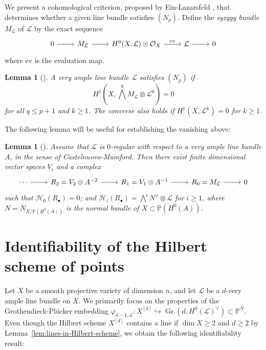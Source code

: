 \documentclass[a4paper]{amsart}
\numberwithin{equation}{section}
\theoremstyle{plain}
\newtheorem{lem}[thm]{Lemma}
\theoremstyle{definition}
\theoremstyle{remark}
\numberwithin{figure}{section}
\numberwithin{table}{section}
\numberwithin{equation}{section}
\def \PP {\mathbb{P}}
\def \Hcal {\mathcal{H}}
\def \Lcal {\mathcal{L}}
\def \Ocal {\mathcal{O}}
\DeclareMathOperator{\Gr}{Gr}
\begin{document}
We present a cohomological criterion, proposed by Ein-Lazarsfeld \cite{EL1993}, that determines whether a given line bundle satisfies $(N_p)$.
Define the \textit{syzygy bundle} $M_{\Lcal}$ of $\Lcal$ by the exact sequence
 \[
  \begin{tikzcd}
      0 \arrow{r} & M_{\Lcal} \arrow{r} & H^0(X, \Lcal) \otimes \Ocal_X \arrow[r, "\mathrm{ev}"] & \Lcal \arrow{r} & 0
  \end{tikzcd}
 \]
where $\mathrm{ev}$ is the evaluation map.

\begin{lem}[{\cite[Lemma~1.6]{EL1993}}] \label{lem:cohomological-criterion-for-np}
    A very ample line bundle $\Lcal$ satisfies $(N_p)$ if
     \begin{equation}
      H^1 \left( X, \bigwedge^q M_{\Lcal} \otimes \Lcal^{k} \right) = 0
     \end{equation}
    for all $q \leq p+1$ and $k \geq 1$.
    The converse also holds if $H^1(X, \Lcal^{k}) = 0$ for $k \geq 1$.
\end{lem}

\noindent The following lemma will be useful for establishing the vanishing above:

\begin{lem}[{\cite[Proposition~2.4]{EL1993}}] \label{lem:non-exact-resolution}
    Assume that $\Lcal$ is $0$-regular with respect to a very ample line bundle $A$, in the sense of Castelnuovo-Mumford.
    Then there exist finite dimensional vector spaces $V_i$ and a complex
     \[
      \begin{tikzcd}
          \cdots \arrow{r} & R_2 = V_2 \otimes A^{-2} \arrow{r} & R_1 = V_1 \otimes A^{-1} \arrow{r} & R_0 = M_{\Lcal} \arrow{r} & 0
      \end{tikzcd}
     \]
    such that $\Hcal_0(R_{\bullet}) = 0$; and $\Hcal_i(R_{\bullet}) = \bigwedge^i N^{\vee} \otimes \Lcal$ for $i \geq 1$, where $N = N_{X/\PP (H^0(A))}$ is the normal bundle of $X \subset \PP (H^0(A))$.
\end{lem}



\section{Identifiability of the Hilbert scheme of points} \label{sec:identifiability}


Let $X$ be a smooth projective variety of dimension $n$, and let $\Lcal$ be a $d$-very ample line bundle on $X$.
We primarily focus on the properties of the Grothendieck-Pl\"ucker embedding $\varphi_{d-1, \Lcal}:X^{[d]} \hookrightarrow \Gr(d, H^0(\Lcal)^{\vee}) \subset \PP^N$.
Even though the Hilbert scheme $X^{[d]}$ contains a line if $\dim X \geq 2$ and $d \geq 2$ by Lemma~\ref{lem:lines-in-Hilbert-scheme}, we obtain the following identifiability result:
\end{document}
